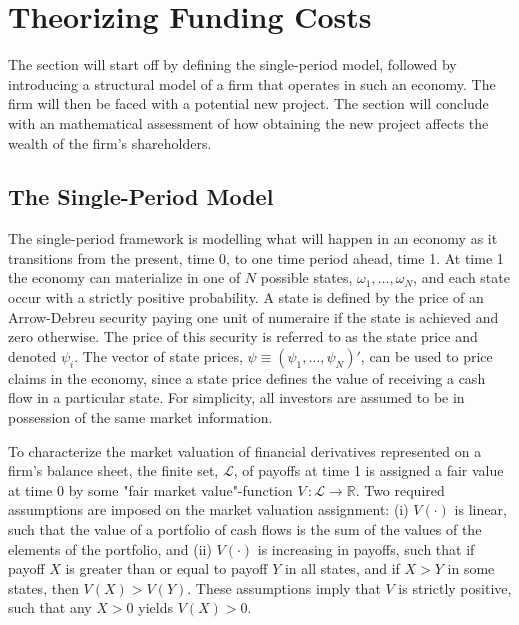 \documentclass[main.tex]{subfiles}
\begin{document}
    \section{Theorizing Funding Costs}
    \label{sec:single-period-model}
        The section will start off by defining the single-period model,
        followed by introducing a structural model of a firm that operates in such an economy.
        The firm will then be faced with a potential new project.
        The section will conclude with an mathematical assessment of 
        how obtaining the new project affects the wealth of the firm's shareholders.

    \subsection{The Single-Period Model}
        The single-period framework is modelling what will happen in an economy as it transitions from the present, time 0, to one time period ahead, time 1.
        At time 1 the economy can materialize in one of $N$ possible states, $\omega_{1}, \dots, \omega_{N}$, and each state occur with a strictly positive probability.
        A state is defined by the price of an Arrow-Debreu security paying one unit of numeraire if the state is achieved and zero otherwise.
        The price of this security is referred to as the state price and denoted $\psi_{i}$.
        The vector of state prices, $\psi \equiv \left(\psi_{1}, \dots, \psi_{N}\right)'$, can be used to price claims in the economy, since a state price defines the value of receiving a cash flow in a particular state.
        For simplicity, all investors are assumed to be in possession of the same market information.

        To characterize the market valuation of financial derivatives represented on a firm's balance sheet, the finite set, $\mathcal{L}$, of payoffs at time 1 is assigned a fair value at time 0 by some "fair market value"-function $V\, \colon \mathcal{L} \rightarrow \mathbb{R}$.
        Two required assumptions are imposed on the market valuation assignment: 
        (i) $V(\cdot)$ is linear, such that the value of a portfolio of cash flows is the sum of the values of the elements of the portfolio, and 
        (ii) $V(\cdot)$ is increasing in payoffs, such that if payoff $X$ is greater than or equal to payoff $Y$ in all states, and if $X>Y$ in some states, then $V(X)>V(Y)$.
        These assumptions imply that $V$ is strictly positive, such that any $X>0$ yields $V(X) > 0$.
        
\end{document}
